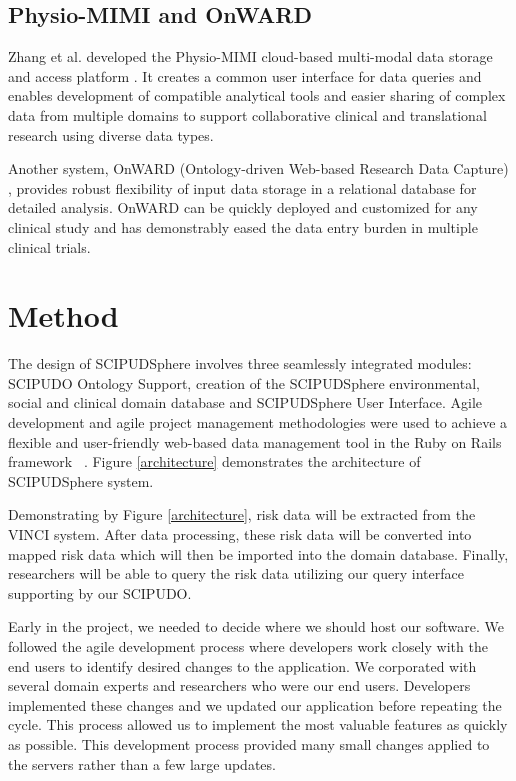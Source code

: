 \documentclass{amia}
\begin{document}
\subsection{Physio-MIMI and OnWARD}
Zhang et al. developed the Physio-MIMI cloud-based multi-modal data storage and access platform \cite{physiomimi}. It creates a common user interface for data queries and enables development of compatible analytical tools and easier sharing of complex data from multiple domains to support collaborative clinical and translational research using diverse data types. 

Another system, OnWARD (Ontology-driven Web-based Research Data Capture) \cite{onward}, provides robust flexibility of input data storage in a relational database for detailed analysis. OnWARD can be quickly deployed and customized for any clinical study and has demonstrably eased the data entry burden in multiple clinical trials. 

\section{Method}
The design of SCIPUDSphere involves three seamlessly integrated modules: SCIPUDO Ontology Support, creation of the SCIPUDSphere environmental, social and clinical domain database and SCIPUDSphere User Interface. Agile development and agile project management methodologies were used to achieve a flexible and user-friendly web-based data management tool in the Ruby on Rails framework ~\cite{ror}. Figure \ref{architecture} demonstrates the architecture of SCIPUDSphere system. 

Demonstrating by Figure \ref{architecture}, risk data will be extracted from the VINCI system. After data processing, these risk data will be converted into mapped risk data which will then be imported into the domain database. Finally, researchers will be able to query the risk data utilizing our query interface supporting by our SCIPUDO. 

Early in the project, we needed to decide where we should host our software. We followed the agile development process where developers work closely with the end users to identify desired changes to the application. We corporated with several domain experts and researchers who were our end users. Developers implemented these changes and we updated our application before repeating the cycle. This process allowed us to implement the most valuable features as quickly as possible. This development process provided many small changes applied to the servers rather than a few large updates.
\end{document}
